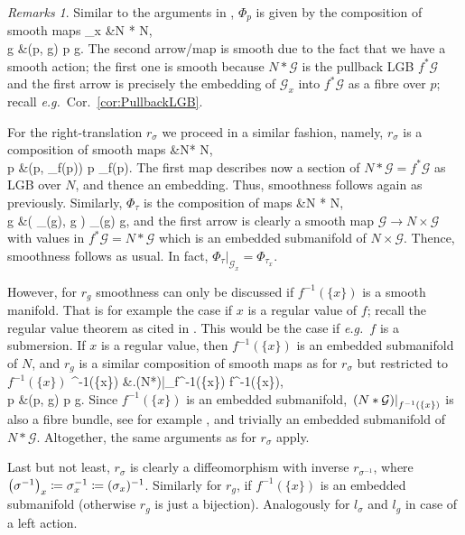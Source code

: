 \documentclass[a4paper,oneside,11pt,bibliography=totoc]{scrartcl}
\def\bas#1\eas{\begin{align*}#1\end{align*}}
\theoremstyle{plain}
\theoremstyle{remark}
\newtheorem{remark}[theorem]{Remarks}
\theoremstyle{definition}
\begin{document}
\begin{remark}\label{SmoothnessOfACtionTranslations}
\leavevmode\newline
Similar to the arguments in \cite[\S 3.2, discussion after Def.\ 3.2.3, page 131]{Hamilton}, $\Phi_p$ is given by the composition of smooth maps
\bas
\mathcal{G}_x &\to N *  \to N,\\
g &\mapsto (p, g) \mapsto p \cdot g.
\eas
The second arrow/map is smooth due to the fact that we have a smooth action; the first one is smooth because $N * \mathcal{G}$ is the pullback LGB $f^*\mathcal{G}$ and the first arrow is precisely the embedding of $\mathcal{G}_x$ into $f^*\mathcal{G}$ as a fibre over $p$; recall \textit{e.g.}\ Cor.\ \ref{cor:PullbackLGB}.

For the right-translation $r_\sigma$ we proceed in a similar fashion, namely, $r_\sigma$ is a composition of smooth maps
\bas
N &\to N* \to N,\\
p &\mapsto \mleft(p, \sigma_{f(p)}\mright) \mapsto p \cdot \sigma_{f(p)}.
\eas
The first map describes now a section of $N*\mathcal{G} = f^*\mathcal{G}$ as LGB over $N$, and thence an embedding. Thus, smoothness follows again as previously. Similarly, $\Phi_\tau$ is the composition of maps
\bas
\mathcal{G} &\to N *  \to N,\\
g &\mapsto \mleft( \tau_{\pi(g)}, g \mright) \mapsto \tau_{\pi(g)} \cdot g,
\eas
and the first arrow is clearly a smooth map $\mathcal{G} \to N \times \mathcal{G}$ with values in $f^*\mathcal{G} = N * \mathcal{G}$ which is an embedded submanifold of $N \times \mathcal{G}$. Thence, smoothness follows as usual. In fact, $\Phi_\tau|_{\mathcal{G}_x} = \Phi_{\tau_x}$.

However, for $r_g$ smoothness can only be discussed if $f^{-1}(\{x\})$ is a smooth manifold. That is for example the case if $x$ is a regular value of $f$; recall the regular value theorem as cited in \cite[\S A.1, Thm.\ A.1.32, page 611]{Hamilton}. This would be the case if \textit{e.g.}\ $f$ is a submersion. If $x$ is a regular value, then $f^{-1}(\{x\})$ is an embedded submanifold of $N$, and $r_g$ is a similar composition of smooth maps as for $r_\sigma$ but restricted to $f^{-1}(\{x\})$
\bas
f^{-1}(\{x\}) &\to \mleft.\mleft(N*\mright)\mright|_{f^{-1}(\{x\})} \to f^{-1}(\{x\}),\\
p &\mapsto (p, g) \mapsto p \cdot g.
\eas
Since $f^{-1}(\{x\})$ is an embedded submanifold, $\mleft.\mleft(N*\mathcal{G}\mright)\mright|_{f^{-1}(\{x\})}$ is also a fibre bundle, see for example \cite[\S 4.1, Lemma 4.1.16, page 204]{Hamilton}, and trivially an embedded submanifold of $N*\mathcal{G}$. Altogether, the same arguments as for $r_\sigma$ apply.

Last but not least, $r_\sigma$ is clearly a diffeomorphism with inverse $r_{\sigma^{-1}}$, where $\mleft(\sigma^{-1}\mright)_x \coloneqq \sigma_x^{-1} \coloneqq (\sigma_x)^{-1}$. Similarly for $r_g$, if $f^{-1}(\{x\})$ is an embedded submanifold (otherwise $r_g$ is just a bijection). Analogously for $l_\sigma$ and $l_g$ in case of a left action.
\end{remark}
\end{document}

